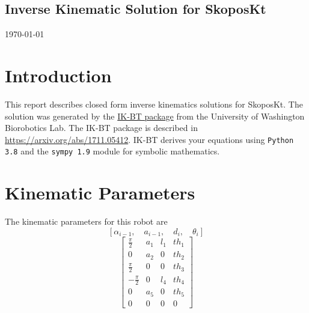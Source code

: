 \documentclass[letterpaper]{article}
\begin{document}
 

















    \begin{center}
    \section*{Inverse Kinematic Solution for SkoposKt}
    \today
    \end{center}
    \section{Introduction}
    This report describes closed form inverse kinematics solutions for SkoposKt.   The solution was generated by
    the \href{https://github.com/uw-biorobotics/IKBT}{IK-BT package}
    from the University of Washington Biorobotics Lab.
    The IK-BT package is described in
    \url{https://arxiv.org/abs/1711.05412}.
    IK-BT derives your  equations
    using {\tt Python 3.8} and the {\tt sympy 1.9} module for symbolic mathematics.
    



\section{Kinematic Parameters}
    The kinematic parameters for this robot are
    \[ \left [ \alpha_{i-1}, \quad a_{i-1}, \quad d_i, \quad \theta_i \right  ] \]
    \begin{dmath}\left[\begin{matrix}\frac{\pi}{2} & a_{1} & l_{1} & th_{1}\\0 & a_{2} & 0 & th_{2}\\\frac{\pi}{2} & 0 & 0 & th_{3}\\- \frac{\pi}{2} & 0 & l_{4} & th_{4}\\0 & a_{5} & 0 & th_{5}\\0 & 0 & 0 & 0\end{matrix}\right]\end{dmath}
\end{document}

